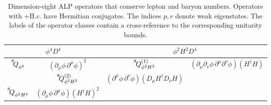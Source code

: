 \begin{table}[htbp]
\begin{tabular}{ c|c||c|c }
\\ \hline
 \multicolumn{2}{c||}{\cellcolor{hdrcolor}\hyperref[par:phi4D4]{\boldmath$\phi^4 D^4$}} & \multicolumn{2}{c}{\cellcolor{hdrcolor}\hyperref[par:phi2H2D4]{\boldmath$\phi^2 H^2 D^4$}} 
 \\ \hline
$\op{8}{\phi^4}{}$ & $(\partial_\mu \phi \, \partial^\mu \phi)^2$ & $\op{8}{\phi^2 H^2}{(1)}$ & $(\partial_\mu \partial_\nu \phi\, \partial^\mu \partial^\nu \phi)(H^\dagger H)$ 
\\ \hhline{--||~|~}
\multicolumn{2}{c||}{\cellcolor{hdrcolor}\hyperref[par:phi2H4D2]{\boldmath$\phi^2 H^4 D^2$}} & $\op{8}{\phi^2 H^2}{(2)}$ & $(\partial^\mu \phi \, \partial^\nu \phi)(D_\mu H^\dagger D_\nu H)$ 
\\ \hhline{--||~|~}
$\op{8}{\phi^2 H^4}{}$ & $(\partial_\mu \phi \, \partial^\mu \phi)(H^\dagger H)^2$ & \multicolumn{2}{c}{} 
\\ \bottomrule
\end{tabular}
\caption{Dimension-eight ALP operators that conserve lepton and baryon numbers.
Operators with $+ \text{H.c.}$ have Hermitian conjugates.
The indices $p,r$ denote weak eigenstates. The labels of the operator classes contain a cross-reference to the corresponding unitarity bounds.\label{tab:ALPdim8}}
\end{table}
